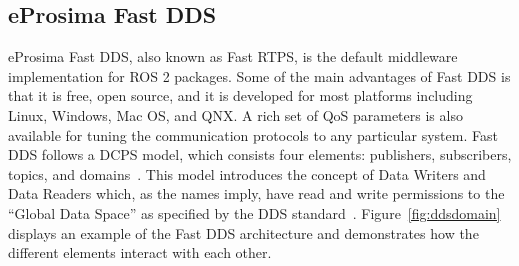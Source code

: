     \subsection{eProsima Fast DDS}

    eProsima Fast \ac{DDS}, also known as Fast \ac{RTPS}, is the default middleware implementation for \ac{ROS} 2 packages. Some of the main advantages of Fast \ac{DDS} is that it is free, open source, and it is developed for most platforms including Linux, Windows, Mac OS, and QNX. A rich set of \ac{QoS} parameters is also available for tuning the communication protocols to any particular system. Fast \ac{DDS} follows a \ac{DCPS} model, which consists four elements: publishers, subscribers, topics, and domains~\cite{dcps}. This model introduces the concept of \textsf{Data Writers} and \textsf{Data Readers} which, as the names imply, have read and write permissions to the ``Global Data Space'' as specified by the \ac{DDS} standard~\cite{introdds}. Figure~\ref{fig:ddsdomain} displays an example of the Fast \ac{DDS} architecture and demonstrates how the different elements interact with each other.

